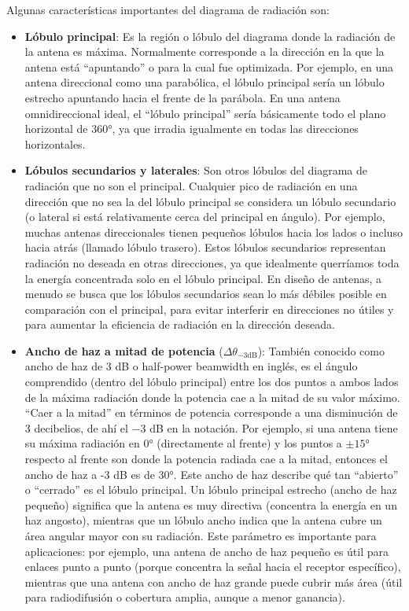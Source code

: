 Algunas características importantes del diagrama de radiación son:\\

\begin{itemize}
    \item \textbf{Lóbulo principal}: Es la región o lóbulo del diagrama donde la radiación de la antena es máxima. Normalmente corresponde a la dirección en la que la antena está “apuntando” o para la cual fue optimizada. Por ejemplo, en una antena direccional como una parabólica, el lóbulo principal sería un lóbulo estrecho apuntando hacia el frente de la parábola. En una antena omnidireccional ideal, el “lóbulo principal” sería básicamente todo el plano horizontal de 360°, ya que irradia igualmente en todas las direcciones horizontales.\\
    
    \item \textbf{Lóbulos secundarios y laterales}: Son otros lóbulos del diagrama de radiación que no son el principal. Cualquier pico de radiación en una dirección que no sea la del lóbulo principal se considera un lóbulo secundario (o lateral si está relativamente cerca del principal en ángulo). Por ejemplo, muchas antenas direccionales tienen pequeños lóbulos hacia los lados o incluso hacia atrás (llamado lóbulo trasero). Estos lóbulos secundarios representan radiación no deseada en otras direcciones, ya que idealmente querríamos toda la energía concentrada solo en el lóbulo principal. En diseño de antenas, a menudo se busca que los lóbulos secundarios sean lo más débiles posible en comparación con el principal, para evitar interferir en direcciones no útiles y para aumentar la eficiencia de radiación en la dirección deseada.\\
    
    \item \textbf{Ancho de haz a mitad de potencia} (\(\Delta\theta_{-3\text{dB}}\)): También conocido como ancho de haz de 3 dB o half-power beamwidth en inglés, es el ángulo comprendido (dentro del lóbulo principal) entre los dos puntos a ambos lados de la máxima radiación donde la potencia cae a la mitad de su valor máximo. “Caer a la mitad” en términos de potencia corresponde a una disminución de 3 decibelios, de ahí el $-3$ dB en la notación. Por ejemplo, si una antena tiene su máxima radiación en 0° (directamente al frente) y los puntos a \(\pm 15°\) respecto al frente son donde la potencia radiada cae a la mitad, entonces el ancho de haz a -3 dB es de $30°$. Este ancho de haz describe qué tan “abierto” o “cerrado” es el lóbulo principal. Un lóbulo principal estrecho (ancho de haz pequeño) significa que la antena es muy directiva (concentra la energía en un haz angosto), mientras que un lóbulo ancho indica que la antena cubre un área angular mayor con su radiación. Este parámetro es importante para aplicaciones: por ejemplo, una antena de ancho de haz pequeño es útil para enlaces punto a punto (porque concentra la señal hacia el receptor específico), mientras que una antena con ancho de haz grande puede cubrir más área (útil para radiodifusión o cobertura amplia, aunque a menor ganancia).\\
\end{itemize}

